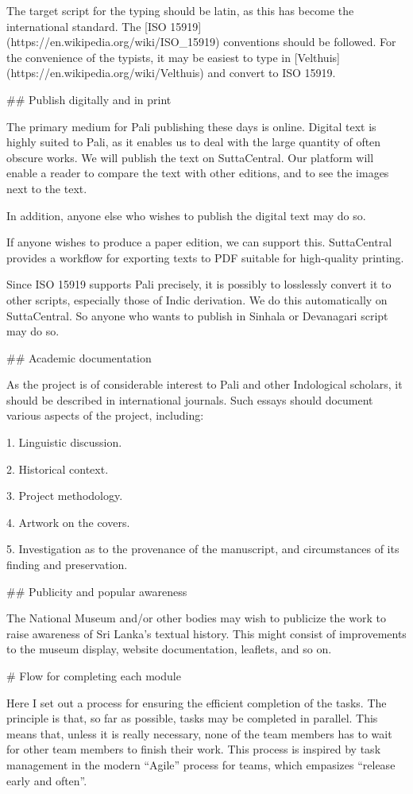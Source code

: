 \documentclass[11pt, openany,a5paper]{article}
\begin{document}
\begin{markdown}
The target script for the typing should be latin, as this has become the international standard. The [ISO 15919](https://en.wikipedia.org/wiki/ISO_15919) conventions should be followed. For the convenience of the typists, it may be easiest to type in [Velthuis](https://en.wikipedia.org/wiki/Velthuis) and convert to ISO 15919.

## Publish digitally and in print

The primary medium for Pali publishing these days is online. Digital text is highly suited to Pali, as it enables us to deal with the large quantity of often obscure works. We will publish the text on SuttaCentral. Our platform will enable a reader to compare the text with other editions, and to see the images next to the text.

In addition, anyone else who wishes to publish the digital text may do so.

If anyone wishes to produce a paper edition, we can support this. SuttaCentral provides a workflow for exporting texts to PDF suitable for high-quality printing.

Since ISO 15919 supports Pali precisely, it is possibly to losslessly convert it to other scripts, especially those of Indic derivation. We do this automatically on SuttaCentral. So anyone who wants to publish in Sinhala or Devanagari script may do so.

## Academic documentation

As the project is of considerable interest to Pali and other Indological scholars, it should be described in international journals. Such essays should document various aspects of the project, including:

1. Linguistic discussion.

2. Historical context.

3. Project methodology.

4. Artwork on the covers.

5. Investigation as to the provenance of the manuscript, and circumstances of its finding and preservation.

## Publicity and popular awareness

The National Museum and/or other bodies may wish to publicize the work to raise awareness of Sri Lanka’s textual history. This might consist of improvements to the museum display, website documentation, leaflets, and so on.

# Flow for completing each module

Here I set out a process for ensuring the efficient completion of the tasks. The principle is that, so far as possible, tasks may be completed in parallel. This means that, unless it is really necessary, none of the team members has to wait for other team members to finish their work. This process is inspired by task management in the modern “Agile” process for teams, which empasizes “release early and often”.


\end{markdown}
\end{document}
